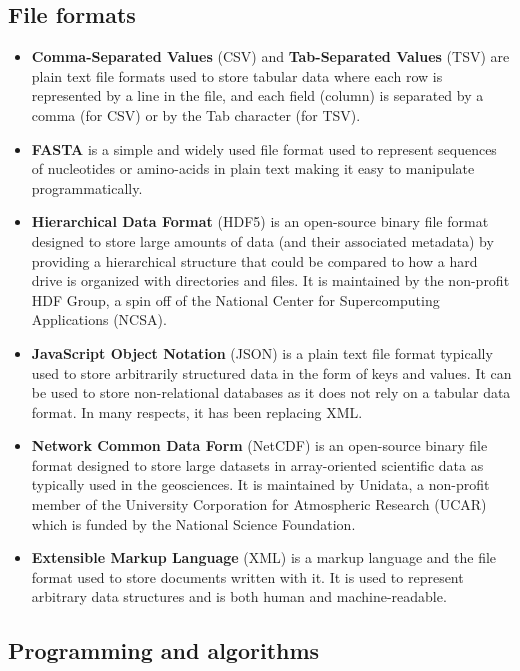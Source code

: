 \documentclass[10pt,letterpaper]{article}
\begin{document}
\subsection*{File formats}\label{file-formats}

\begin{itemize}
\item
  \textbf{Comma-Separated Values} (CSV) and \textbf{Tab-Separated
  Values} (TSV) are plain text file formats used to store tabular data
  where each row is represented by a line in the file, and each field
  (column) is separated by a comma (for CSV) or by the Tab character
  (for TSV).
\item
  \textbf{FASTA} is a simple and widely used file format used to
  represent sequences of nucleotides or amino-acids in plain text making
  it easy to manipulate programmatically.
\item
  \textbf{Hierarchical Data Format} (HDF5) is an open-source binary file
  format designed to store large amounts of data (and their associated
  metadata) by providing a hierarchical structure that could be compared
  to how a hard drive is organized with directories and files. It is
  maintained by the non-profit HDF Group, a spin off of the National
  Center for Supercomputing Applications (NCSA).
\item
  \textbf{JavaScript Object Notation} (JSON) is a plain text file format
  typically used to store arbitrarily structured data in the form of
  keys and values. It can be used to store non-relational databases as
  it does not rely on a tabular data format. In many respects, it has
  been replacing XML.
\item
  \textbf{Network Common Data Form} (NetCDF) is an open-source binary
  file format designed to store large datasets in array-oriented
  scientific data as typically used in the geosciences. It is maintained
  by Unidata, a non-profit member of the University Corporation for
  Atmospheric Research (UCAR) which is funded by the National Science
  Foundation.
\item
  \textbf{Extensible Markup Language} (XML) is a markup language and the
  file format used to store documents written with it. It is used to
  represent arbitrary data structures and is both human and
  machine-readable.
\end{itemize}

\subsection*{Programming and
algorithms}\label{programming-and-algorithms}
\end{document}
